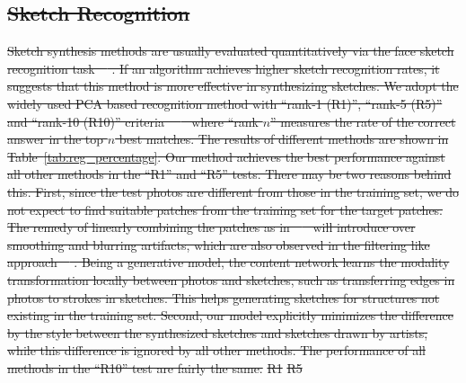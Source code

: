\documentclass[10pt,twocolumn,letterpaper]{article}
\providecommand{\DIFdeltex}[1]{{\protect\color{red}\sout{#1}}}                      %
\providecommand{\DIFdelFL}[1]{\DIFdel{#1}} %
\providecommand{\DIFdel}[1]{\texorpdfstring{\DIFdeltex{#1}}{}} %
\begin{document}
\subsection{\DIFdel{Sketch Recognition}}
\addtocounter{subsection}{-1}%
\DIFdel{Sketch synthesis methods are usually evaluated quantitatively  via the face sketch recognition task~\mbox{%
\cite{song2014real,wang2009face,zhang2015end,zhou2012markov}}%
. If an algorithm achieves higher sketch recognition rates, it suggests that this method is more effective in synthesizing sketches. We adopt the widely used PCA based recognition method with ``rank-1 (R1)'', ``rank-5 (R5)'' and ``rank-10 (R10)'' criteria ~\mbox{%
\cite{wang2009face} }%
where ``rank $n$'' measures the rate of the correct answer in the top $n$ best matches. The results of different methods are shown in Table~\ref{tab:reg_percentage}. Our method achieves the best performance against all other methods in the ``R1'' and ``R5'' tests. There may be two reasons behind this. First, since the test photos are different from those in the training set, we do not expect to find suitable patches from the training set for the target patches. The remedy of linearly combining the patches as in~\mbox{%
\cite{zhou2012markov} }%
will introduce over smoothing and blurring artifacts, which are also observed in the filtering like approach~\mbox{%
\cite{song2014real}}%
. Being a generative model, the content network learns the modality transformation locally between photos and sketches, such as transferring edges in photos to strokes in sketches. This helps generating sketches for structures not existing in the training set. Second, our model explicitly minimizes the difference by the style between the synthesized sketches and sketches drawn by artists, while this difference is ignored by all other methods. The performance of all methods in the ``R10'' test are fairly the same.
}%
\DIFdelFL{R1 }%
\DIFdelFL{R5 }%
\end{document}
